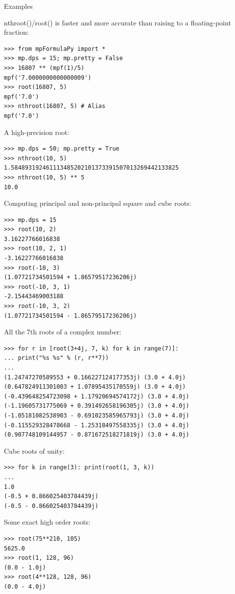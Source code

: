 \vpara
Examples

nthroot()/root() is faster and more accurate than raising to a floating-point fraction:

\begin{lstlisting}
>>> from mpFormulaPy import *
>>> mp.dps = 15; mp.pretty = False
>>> 16807 ** (mpf(1)/5)
mpf('7.0000000000000009')
>>> root(16807, 5)
mpf('7.0')
>>> nthroot(16807, 5) # Alias
mpf('7.0')
\end{lstlisting}


A high-precision root:
\begin{lstlisting}
>>> mp.dps = 50; mp.pretty = True
>>> nthroot(10, 5)
1.584893192461113485202101373391507013269442133825
>>> nthroot(10, 5) ** 5
10.0
\end{lstlisting}




Computing principal and non-principal square and cube roots:
\begin{lstlisting}
>>> mp.dps = 15
>>> root(10, 2)
3.16227766016838
>>> root(10, 2, 1)
-3.16227766016838
>>> root(-10, 3)
(1.07721734501594 + 1.86579517236206j)
>>> root(-10, 3, 1)
-2.15443469003188
>>> root(-10, 3, 2)
(1.07721734501594 - 1.86579517236206j)
\end{lstlisting}



All the 7th roots of a complex number:
\begin{lstlisting}
>>> for r in [root(3+4j, 7, k) for k in range(7)]:
... print("%s %s" % (r, r**7))
...
(1.24747270589553 + 0.166227124177353j) (3.0 + 4.0j)
(0.647824911301003 + 1.07895435170559j) (3.0 + 4.0j)
(-0.439648254723098 + 1.17920694574172j) (3.0 + 4.0j)
(-1.19605731775069 + 0.391492658196305j) (3.0 + 4.0j)
(-1.05181082538903 - 0.691023585965793j) (3.0 + 4.0j)
(-0.115529328478668 - 1.25318497558335j) (3.0 + 4.0j)
(0.907748109144957 - 0.871672518271819j) (3.0 + 4.0j)
\end{lstlisting}


Cube roots of unity:
\begin{lstlisting}
>>> for k in range(3): print(root(1, 3, k))
...
1.0
(-0.5 + 0.866025403784439j)
(-0.5 - 0.866025403784439j)
\end{lstlisting}




Some exact high order roots:
\begin{lstlisting}
>>> root(75**210, 105)
5625.0
>>> root(1, 128, 96)
(0.0 - 1.0j)
>>> root(4**128, 128, 96)
(0.0 - 4.0j)
\end{lstlisting}



